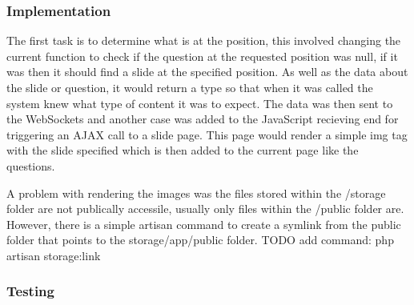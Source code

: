 \subsubsection{Implementation}
The first task is to determine what is at the position, this involved changing the current function to check if the question at the requested position was null, if it was then it should find a slide at the specified position. As well as the data about the slide or question, it would return a type so that when it was called the system knew what type of content it was to expect. The data was then sent to the WebSockets and another case was added to the JavaScript recieving end for triggering an AJAX call to a slide page. This page would render a simple img tag with the slide specified which is then added to the current page like the questions.

A problem with rendering the images was the files stored within the /storage folder are not publically accessile, usually only files within the /public folder are. However, there is a simple artisan command to create a symlink from the public folder that points to the storage/app/public folder. TODO add command: php artisan storage:link
\subsubsection{Testing}
\newpage